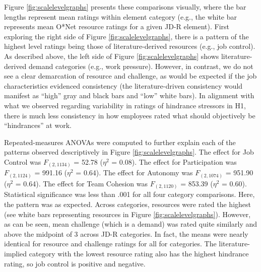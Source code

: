 \documentclass[
  man,mask]{apa7}
\begin{document}
Figure \ref{fig:scalelevelgraphs} presents these comparisons visually, where the bar lengths represent mean ratings within element category (e.g., the white bar represents mean O*Net resource ratings for a given JD-R element). First exploring the right side of Figure \ref{fig:scalelevelgraphs}, there is a pattern of the highest level ratings being those of literature-derived resources (e.g., job control). As described above, the left side of Figure \ref{fig:scalelevelgraphs} shows literature-derived demand categories (e.g., work pressure). However, in contrast, we do not see a clear demarcation of resource and challenge, as would be expected if the job characteristics evidenced consistency (the literature-driven consistency would manifest as ``high'' gray and black bars and ``low'' white bars). In alignment with what we observed regarding variability in ratings of hindrance stressors in H1, there is much less consistency in how employees rated what should objectively be ``hindrances'' at work.

Repeated-measures ANOVAs were computed to further explain each of the patterns observed descriptively in Figure \ref{fig:scalelevelgraphs}. The effect for Job Control was \(F_{(2, 1134)}\) = 52.78 (\(\eta^2\) = 0.08).
The effect for Participation was \(F_{(2, 1124)}\) = 991.16 (\(\eta^2\) = 0.64).
The effect for Autonomy was \(F_{(2, 1074)}\) = 951.90 (\(\eta^2\) = 0.64).
The effect for Team Cohesion was \(F_{(2, 1120)}\) = 853.39 (\(\eta^2\) = 0.60). Statistical significance was less than .001 for all four category comparisons. Here, the pattern was as expected. Across categories, resources were rated the highest (see white bars representing resources in Figure \ref{fig:scalelevelgraphs}). However, as can be seen, mean challenge (which is a demand) was rated quite similarly and above the midpoint of 3 across JD-R categories. In fact, the means were nearly identical for resource and challenge ratings for all for categories. The literature-implied category with the lowest resource rating also has the highest hindrance rating, so job control is positive and negative.
\end{document}
